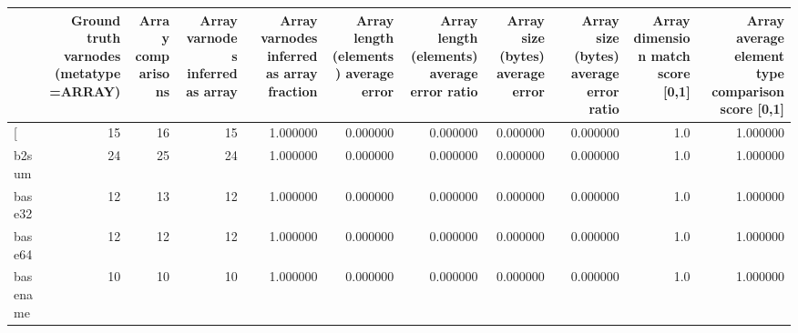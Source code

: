 \begin{tabular}{lrrrrrrrrrr}
\toprule
{} &  Ground truth varnodes (metatype=ARRAY) &  Array comparisons &  Array varnodes inferred as array &  Array varnodes inferred as array fraction &  Array length (elements) average error &  Array length (elements) average error ratio &  Array size (bytes) average error &  Array size (bytes) average error ratio &  Array dimension match score [0,1] &  Array average element type comparison score [0,1] \\
\midrule
[         &                                      15 &                 16 &                                15 &                                   1.000000 &                               0.000000 &                                     0.000000 &                          0.000000 &                                0.000000 &                                1.0 &                                           1.000000 \\
b2sum     &                                      24 &                 25 &                                24 &                                   1.000000 &                               0.000000 &                                     0.000000 &                          0.000000 &                                0.000000 &                                1.0 &                                           1.000000 \\
base32    &                                      12 &                 13 &                                12 &                                   1.000000 &                               0.000000 &                                     0.000000 &                          0.000000 &                                0.000000 &                                1.0 &                                           1.000000 \\
base64    &                                      12 &                 12 &                                12 &                                   1.000000 &                               0.000000 &                                     0.000000 &                          0.000000 &                                0.000000 &                                1.0 &                                           1.000000 \\
basename  &                                      10 &                 10 &                                10 &                                   1.000000 &                               0.000000 &                                     0.000000 &                          0.000000 &                                0.000000 &                                1.0 &                                           1.000000 \\

\end{tabular}
